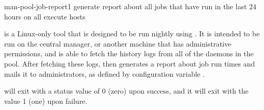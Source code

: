 \begin{ManPage}{}{man-pool-job-report}{1}
{generate report about all jobs that have run in the last 24 hours on
all execute hosts}

\Synopsis


\Description

 is a Linux-only 
tool that is designed to be run nightly using .
It is intended to be run on the central manager, 
or another machine that has administrative permissions,
and is able to fetch the  history logs
from all of the  daemons in the pool.
After fetching these logs, 
 then generates a report about job run times
and mails it to administrators, 
as defined by configuration variable .

\ExitStatus

 will exit with a status value of 0 (zero) 
upon success,
and it will exit with the value 1 (one) upon failure.

\end{ManPage}
